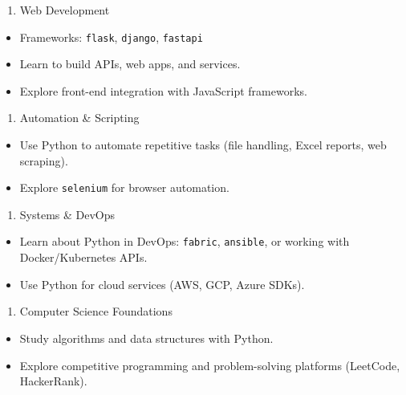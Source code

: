 \documentclass[
  letterpaper,
  DIV=11,
  numbers=noendperiod]{scrreprt}
\providecommand{\tightlist}{%
  \setlength{\itemsep}{0pt}\setlength{\parskip}{0pt}}
\begin{document}
\begin{enumerate}
\def\labelenumi{\arabic{enumi}.}
\setcounter{enumi}{1}
\tightlist
\item
  Web Development
\end{enumerate}

\begin{itemize}
\tightlist
\item
  Frameworks: \texttt{flask}, \texttt{django}, \texttt{fastapi}
\item
  Learn to build APIs, web apps, and services.
\item
  Explore front-end integration with JavaScript frameworks.
\end{itemize}

\begin{enumerate}
\def\labelenumi{\arabic{enumi}.}
\setcounter{enumi}{2}
\tightlist
\item
  Automation \& Scripting
\end{enumerate}

\begin{itemize}
\tightlist
\item
  Use Python to automate repetitive tasks (file handling, Excel reports,
  web scraping).
\item
  Explore \texttt{selenium} for browser automation.
\end{itemize}

\begin{enumerate}
\def\labelenumi{\arabic{enumi}.}
\setcounter{enumi}{3}
\tightlist
\item
  Systems \& DevOps
\end{enumerate}

\begin{itemize}
\tightlist
\item
  Learn about Python in DevOps: \texttt{fabric}, \texttt{ansible}, or
  working with Docker/Kubernetes APIs.
\item
  Use Python for cloud services (AWS, GCP, Azure SDKs).
\end{itemize}

\begin{enumerate}
\def\labelenumi{\arabic{enumi}.}
\setcounter{enumi}{4}
\tightlist
\item
  Computer Science Foundations
\end{enumerate}

\begin{itemize}
\tightlist
\item
  Study algorithms and data structures with Python.
\item
  Explore competitive programming and problem-solving platforms
  (LeetCode, HackerRank).
\end{itemize}
\end{document}
